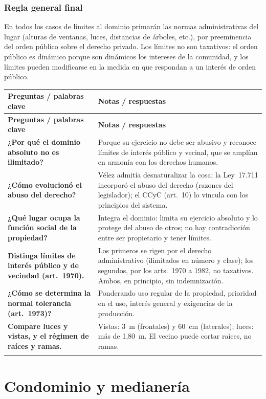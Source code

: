 \documentclass[12pt,oneside]{book}
\makeatletter
\renewcommand{\arraystretch}{1.25}
\newcommand{\cq}[2]{\textbf{#1} & #2 \\[0.45em]}
\newcommand{\cornell}[3]{%
\par\bigskip\noindent{\large\bfseries Cuadro Cornell: #1}\par\nopagebreak\smallskip
\begingroup
\small
\renewcommand{\arraystretch}{1.15}
\begin{longtable}{@{}>{\raggedright\arraybackslash}p{0.26\textwidth}>{\raggedright\arraybackslash}p{0.66\textwidth}@{}}
\toprule
\textbf{Preguntas / palabras clave} & \textbf{Notas / respuestas} \\
\midrule
\endfirsthead
\toprule
\textbf{Preguntas / palabras clave} & \textbf{Notas / respuestas} \\
\midrule
\endhead
#2
\midrule
\multicolumn{2}{@{}p{\dimexpr0.92\textwidth+2\tabcolsep\relax}@{}}{\vspace{0.2em}\textbf{Resumen.} #3\vspace{0.2em}} \\
\bottomrule
\end{longtable}
\endgroup
}
\makeatother
\begin{document}
\section{Regla general final}

\begin{importante}
En todos los casos de límites al dominio primarán las normas administrativas del lugar (alturas de ventanas, luces, distancias de árboles, etc.), por preeminencia del orden público sobre el derecho privado. Los límites no son taxativos: el orden público es dinámico porque son dinámicos los intereses de la comunidad, y los límites pueden modificarse en la medida en que respondan a un interés de orden público.
\end{importante}

\cornell{límites al dominio}{
\cq{¿Por qué el dominio absoluto no es ilimitado?}{Porque su ejercicio no debe ser abusivo y reconoce límites de interés público y vecinal, que se amplían en armonía con los derechos humanos.}
\cq{¿Cómo evolucionó el abuso del derecho?}{Vélez admitía desnaturalizar la cosa; la Ley~17.711 incorporó el abuso del derecho (razones del legislador); el CCyC (art.~10) lo vincula con los principios del sistema.}
\cq{¿Qué lugar ocupa la función social de la propiedad?}{Integra el dominio: limita su ejercicio absoluto y lo protege del abuso de otros; no hay contradicción entre ser propietario y tener límites.}
\cq{Distinga límites de interés público y de vecindad (art.~1970).}{Los primeros se rigen por el derecho administrativo (ilimitados en número y clase); los segundos, por los arts.~1970 a 1982, no taxativos. Ambos, en principio, sin indemnización.}
\cq{¿Cómo se determina la normal tolerancia (art.~1973)?}{Ponderando uso regular de la propiedad, prioridad en el uso, interés general y exigencias de la producción.}
\cq{Compare luces y vistas, y el régimen de raíces y ramas.}{Vistas: 3~m (frontales) y 60~cm (laterales); luces: más de 1,80~m. El vecino puede cortar raíces, no ramas.}
}{El dominio absoluto está sometido a límites de interés público (derecho administrativo) y vecinal (arts.~1970 a 1982), fundados en la función social de la propiedad y en el abuso del derecho. Las normas administrativas primarán siempre y los límites no son taxativos.}



\part{Condominio y medianería}
\end{document}
